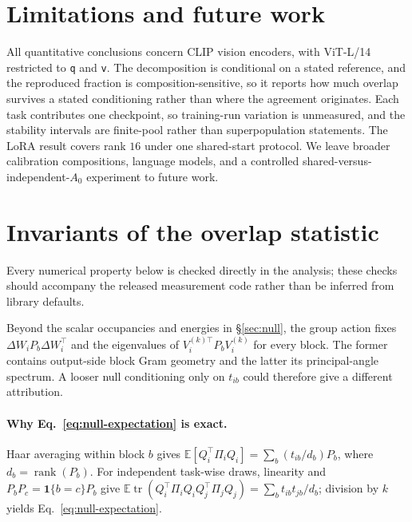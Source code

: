 \section{Limitations and future work}
\label{app:limits}

All quantitative conclusions concern CLIP vision encoders, with ViT-L/14 restricted to \texttt{q}
and \texttt{v}. The decomposition is conditional on a stated reference, and the reproduced
fraction is composition-sensitive, so it reports how much overlap survives a stated conditioning
rather than where the agreement originates. Each task contributes one checkpoint, so training-run
variation is unmeasured, and the stability intervals are finite-pool rather than superpopulation
statements. The LoRA result covers rank $16$ under one shared-start protocol. We leave broader
calibration compositions, language models, and a controlled shared-versus-independent-$A_0$
experiment to future work.

\section{Invariants of the overlap statistic}
\label{app:invariants}

Every numerical property below is checked directly in the analysis; these checks should accompany
the released measurement code rather than be inferred from library defaults.

Beyond the scalar occupancies and energies in \S\ref{sec:null}, the group action fixes
$\Delta W_iP_b\Delta W_i^\top$ and the eigenvalues of
$V_i^{(k)\top}P_bV_i^{(k)}$ for every block. The former contains output-side block Gram geometry
and the latter its principal-angle spectrum. A looser null conditioning only on $t_{ib}$ could
therefore give a different attribution.

\paragraph{Why Eq.~\ref{eq:null-expectation} is exact.}
Haar averaging within block $b$ gives
$\mathbb E[Q_i^\top\Pi_iQ_i]=\sum_b(t_{ib}/d_b)P_b$, where
$d_b=\operatorname{rank}(P_b)$. For independent task-wise draws, linearity and
$P_bP_c=\mathbf 1\{b=c\}P_b$ give
$\mathbb E\operatorname{tr}(Q_i^\top\Pi_iQ_iQ_j^\top\Pi_jQ_j)
=\sum_b t_{ib}t_{jb}/d_b$; division by $k$ yields Eq.~\ref{eq:null-expectation}.

